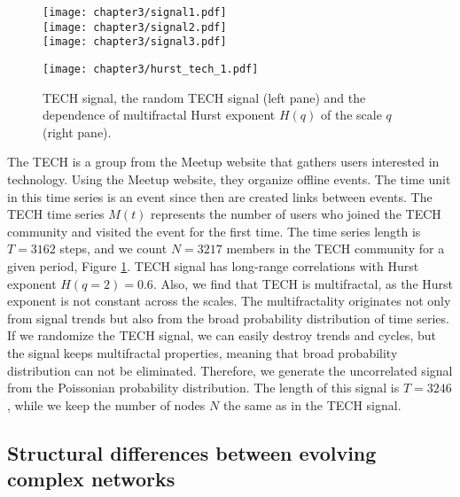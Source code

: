 \begin{figure}[ht]
	\centering
	\begin{minipage}[b]{0.4\textwidth}
		\centering
		\texttt{[image: chapter3/signal1.pdf]}\\
		\texttt{[image: chapter3/signal2.pdf]}\\
		\texttt{[image: chapter3/signal3.pdf]}
		
	\end{minipage}
	\begin{minipage}[b]{0.45\textwidth}
		\centering
		\texttt{[image: chapter3/hurst\_tech\_1.pdf]}
		\vspace{1cm}
	\end{minipage}
	\caption[Properties of the TECH and Poisson signals.]{TECH signal, the random TECH signal (left pane) and the dependence of multifractal Hurst exponent $H(q)$ of the scale $q$ (right pane).}
	\label{fig:tech_signals}
\end{figure}

The TECH is a group from the Meetup website that gathers users interested in technology. Using the Meetup website, they organize offline events. The time unit in this time series is an event since then are created links between events. The TECH time series $M(t)$ represents the number of users who joined the TECH community and visited the event for the first time. The time series length is $T=3162$ steps, and we count $N=3217$ members in the TECH community for a given period, Figure \ref{fig:tech_signals}. TECH signal has long-range correlations with Hurst exponent $H(q=2)=0.6$. Also, we find that TECH is multifractal, as the Hurst exponent is not constant across the scales. The multifractality originates not only from signal trends but also from the broad probability distribution of time series. If we randomize the TECH signal, we can easily destroy trends and cycles, but the signal keeps multifractal properties, meaning that broad probability distribution can not be eliminated. Therefore, we generate the uncorrelated signal from the Poissonian probability distribution. The length of this signal is  $T = 3246$, while we keep the number of nodes $N$ the same as in the TECH signal.


\subsection{Structural differences between evolving complex networks}

